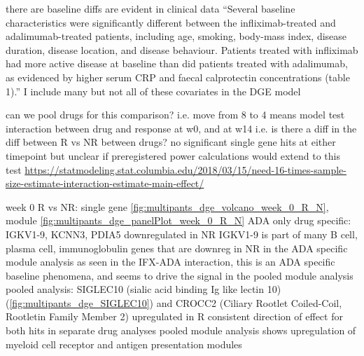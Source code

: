 \begin{outline}
\1 there are baseline diffs are evident in clinical data 
    \2 “Several baseline characteristics were significantly different between the infliximab-treated and adalimumab-treated patients, including age, smoking, body-mass index, disease duration, disease location, and disease behaviour. Patients treated with infliximab had more active disease at baseline than did patients treated with adalimumab, as evidenced by higher serum CRP and faecal calprotectin concentrations (table 1).” \autocite{kennedy2019PredictorsAntiTNFTreatment}
    \2 I include many but not all of these covariates in the DGE model

\1 can we pool drugs for this comparison? i.e. move from 8 to 4 means model
    \2 test interaction between drug and response at w0, and at w14 i.e. is there a diff in the diff between R vs NR between drugs?
    \2 no significant single gene hits at either timepoint
    \2 but unclear if preregistered power calculations would extend to this test \url{https://statmodeling.stat.columbia.edu/2018/03/15/need-16-times-sample-size-estimate-interaction-estimate-main-effect/}

\1 week 0 R vs NR: single gene \autoref{fig:multipants_dge_volcano_week_0_R_N}, module \autoref{fig:multipants_dge_panelPlot_week_0_R_N}
    \2 ADA only drug specific: IGKV1-9, KCNN3, PDIA5 downregulated in NR
        \3 IGKV1-9 is part of many B cell, plasma cell, immunoglobulin genes that are downreg in NR in the ADA specific module analysis
        \3 as seen in the IFX-ADA interaction, this is an ADA specific baseline phenomena, and seems to drive the signal in the pooled module analysis
    \2 pooled analysis: SIGLEC10 (sialic acid binding Ig like lectin 10) (\autoref{fig:multipants_dge_SIGLEC10}) and CROCC2 (Ciliary Rootlet Coiled-Coil, Rootletin Family Member 2) upregulated in R
        \3 consistent direction of effect for both hits in separate drug analyses
        \3 pooled module analysis shows upregulation of myeloid cell receptor and antigen presentation modules


\end{outline}
